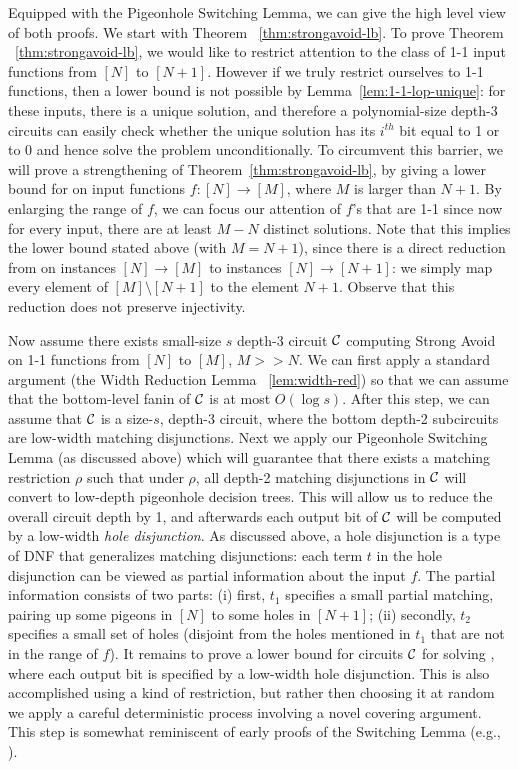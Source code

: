Equipped with the Pigeonhole Switching Lemma, we can give the high level view of both proofs. 
We start with Theorem ~\ref{thm:strongavoid-lb}.
To prove Theorem ~\ref{thm:strongavoid-lb}, we would like to restrict  attention to the class of 1-1 input functions from $[N]$ to $[N+1]$. However if we truly restrict ourselves to 1-1 functions,
then a lower bound is not possible by Lemma~\ref{lem:1-1-lop-unique}: for these inputs, there is a unique solution, and therefore a polynomial-size depth-3 circuits can easily check whether the unique solution has its $i^{th}$ bit equal to 1 or to 0 and hence solve the problem unconditionally.
To circumvent this barrier, we will prove a strengthening of Theorem~\ref{thm:strongavoid-lb}, by giving a lower bound for \avoid on input functions $f: [N] \rightarrow [M]$, where $M$ is larger than $N+1$. By enlarging the range of $f$, we can focus our attention of $f$'s that are 1-1 since now for every input, there are at least $M-N$ distinct solutions.
Note that this implies the lower bound stated above (with $M=N+1$), since there is a direct reduction from \avoid on instances $[N] \to [M]$ to instances $[N] \to [N+1]$: we simply map every element of $[M] \setminus [N+1]$ to the element $N+1$. Observe that this reduction does not preserve injectivity.

Now assume there exists small-size $s$ depth-3 circuit ${\cal C}$ computing {\sc Strong Avoid} on 1-1 functions from $[N]$ to $[M]$, $M>>N$. 
We can first apply a standard argument (the Width Reduction Lemma ~\ref{lem:width-red}) so that we can assume that the bottom-level fanin of ${\cal C}$ is at most $O(\log s)$. After this step, we can assume that ${\cal C}$ is a size-$s$, depth-3 circuit, where the bottom depth-2 subcircuits are low-width matching disjunctions. 
Next we apply our Pigeonhole Switching Lemma (as discussed above) which will guarantee that there exists a matching restriction $\rho$ such that under $\rho$, all depth-2 matching disjunctions in ${\cal C}$ will convert to low-depth pigeonhole decision trees. This will allow us to reduce the overall circuit depth by 1, and afterwards each output bit of ${\cal C}$ will be computed by a low-width \emph{hole disjunction}.
As discussed above, a hole disjunction is a type of DNF that generalizes matching disjunctions: each term $t$ in the hole disjunction can be viewed as partial information about the input $f$. The partial information consists of two parts: (i) first, $t_1$ specifies a small partial matching, pairing up some pigeons in $[N]$ to some holes in $[N+1]$; (ii) secondly, $t_2$ specifies a small set of holes (disjoint from the holes mentioned in $t_1$ that are not in the range of $f$).
It remains to prove a lower bound for circuits ${\cal C}$ for solving \avoid, where each output bit is specified by a low-width hole disjunction. This is also accomplished using a kind of restriction, but rather then choosing it at random we apply a careful deterministic process involving a novel covering argument. This step is somewhat reminiscent of early proofs of the Switching Lemma (e.g., \cite{FSS,Ajtai83}).



